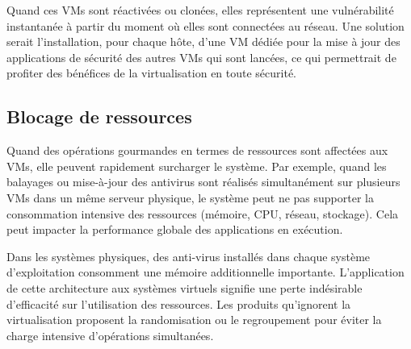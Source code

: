 Quand ces VMs sont réactivées ou clonées, elles représentent une vulnérabilité instantanée à partir du moment où elles sont connectées au réseau. Une solution serait l'installation,  pour chaque hôte, d'une VM dédiée pour la mise à jour des applications de sécurité des autres VMs qui sont lancées, ce qui permettrait de profiter des bénéfices de la virtualisation en toute sécurité. 

\subsection*{Blocage de ressources}

Quand des opérations gourmandes en termes de ressources sont affectées aux VMs, elle peuvent rapidement surcharger le système. Par exemple, quand les balayages ou mise-à-jour des antivirus sont réalisés simultanément sur plusieurs VMs dans un même serveur physique, le système peut ne pas supporter la consommation intensive des ressources (mémoire, CPU, réseau, stockage). Cela peut impacter la performance globale des applications en exécution.

Dans les systèmes physiques, des anti-virus installés dans chaque système d'exploitation consomment une mémoire additionnelle importante. L'application de cette architecture aux systèmes virtuels signifie une perte indésirable d'efficacité sur l'utilisation des ressources. Les produits qu'ignorent la virtualisation proposent la randomisation ou le regroupement pour éviter la charge intensive d'opérations simultanées.

